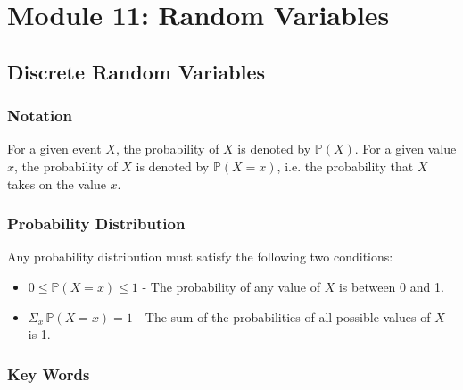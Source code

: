\documentclass[12pt letter]{report}
\begin{document}
\chapter{Module 11: Random Variables}




\section{Discrete Random Variables}

\subsection{Notation}

For a given event $X$, the probability of $X$ is denoted by $\mathbb{P} \left( X \right) $. For a given value $x$, the
probability of $X$ is denoted by $\mathbb{P} \left( X = x \right) $, i.e. the probability that $X$ takes on the value $x$.

\subsection{Probability Distribution}


Any probability distribution must satisfy the following two conditions:

\begin{itemize}
	\item $0 \leq \mathbb{P} \left( X = x  \right) \leq 1 $ - The probability of any value of $X$ is between 0 and 1.
	\item $\Sigma_x \,  \mathbb{P} \left( X = x \right) = 1 $ - The sum of the probabilities of all possible values of $X$ is 1.
\end{itemize}

\subsection{Key Words}
\end{document}
